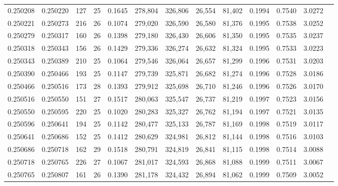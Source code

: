 \begin{tabular}{rrrrrrrrrrrrr}
0.250208 & 0.250220 &   127 &  25 &                                     0.1645 & 278,804 & 326,806 &  26,554 &  81,402 & 0.1994 & 0.7540 & 3.0272 \\
0.250221 & 0.250273 &   216 &  26 &                                     0.1074 & 279,020 & 326,590 &  26,580 &  81,376 & 0.1995 & 0.7538 & 3.0252 \\
0.250279 & 0.250317 &   160 &  26 &                                     0.1398 & 279,180 & 326,430 &  26,606 &  81,350 & 0.1995 & 0.7535 & 3.0237 \\
0.250318 & 0.250343 &   156 &  26 &                                     0.1429 & 279,336 & 326,274 &  26,632 &  81,324 & 0.1995 & 0.7533 & 3.0223 \\
0.250343 & 0.250389 &   210 &  25 &                                     0.1064 & 279,546 & 326,064 &  26,657 &  81,299 & 0.1996 & 0.7531 & 3.0203 \\
0.250390 & 0.250466 &   193 &  25 &                                     0.1147 & 279,739 & 325,871 &  26,682 &  81,274 & 0.1996 & 0.7528 & 3.0186 \\
0.250466 & 0.250516 &   173 &  28 &                                     0.1393 & 279,912 & 325,698 &  26,710 &  81,246 & 0.1996 & 0.7526 & 3.0170 \\
0.250516 & 0.250550 &   151 &  27 &                                     0.1517 & 280,063 & 325,547 &  26,737 &  81,219 & 0.1997 & 0.7523 & 3.0156 \\
0.250550 & 0.250595 &   220 &  25 &                                     0.1020 & 280,283 & 325,327 &  26,762 &  81,194 & 0.1997 & 0.7521 & 3.0135 \\
0.250596 & 0.250641 &   194 &  25 &                                     0.1142 & 280,477 & 325,133 &  26,787 &  81,169 & 0.1998 & 0.7519 & 3.0117 \\
0.250641 & 0.250686 &   152 &  25 &                                     0.1412 & 280,629 & 324,981 &  26,812 &  81,144 & 0.1998 & 0.7516 & 3.0103 \\
0.250686 & 0.250718 &   162 &  29 &                                     0.1518 & 280,791 & 324,819 &  26,841 &  81,115 & 0.1998 & 0.7514 & 3.0088 \\
0.250718 & 0.250765 &   226 &  27 &                                     0.1067 & 281,017 & 324,593 &  26,868 &  81,088 & 0.1999 & 0.7511 & 3.0067 \\
0.250765 & 0.250807 &   161 &  26 &                                     0.1390 & 281,178 & 324,432 &  26,894 &  81,062 & 0.1999 & 0.7509 & 3.0052 \\

\end{tabular}

